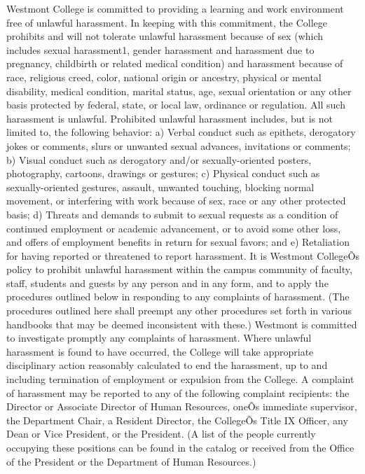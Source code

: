 \documentclass[letterpaper, 11pt]{article}
\begin{document}
	Westmont College is committed to providing a learning and work environment free of unlawful harassment.  In keeping with this commitment, the College prohibits and will not tolerate unlawful harassment because of sex (which includes sexual harassment1, gender harassment and harassment due to pregnancy, childbirth or related medical condition) and harassment because of race, religious creed, color, national origin or ancestry, physical or mental disability, medical condition, marital status, age, sexual orientation or any other basis protected by federal, state, or local law, ordinance or regulation.  All such harassment is unlawful.
	Prohibited unlawful harassment includes, but is not limited to, the following behavior:
	a) Verbal conduct such as epithets, derogatory jokes or comments, slurs or unwanted sexual advances, invitations or comments;
	b) Visual conduct such as derogatory and/or sexually-oriented posters, photography, cartoons, drawings or gestures;
	c) Physical conduct such as sexually-oriented gestures, assault, unwanted touching, blocking normal movement, or interfering with work because of sex, race or any other protected basis;
	d) Threats and demands to submit to sexual requests as a condition of continued employment or academic advancement, or to avoid some other loss, and offers of employment benefits in return for sexual favors; and
	e) Retaliation for having reported or threatened to report harassment.
	It is Westmont CollegeÕs policy to prohibit unlawful harassment within the campus community of faculty, staff, students and guests by any person and in any form, and to apply the procedures outlined below in responding to any complaints of harassment.  (The procedures outlined here shall preempt any other procedures set forth in various handbooks that may be deemed inconsistent with these.)  Westmont is committed to investigate promptly any complaints of harassment.  Where unlawful harassment is found to have occurred, the College will take appropriate disciplinary action reasonably calculated to end the harassment, up to and including termination of employment or expulsion from the College.
	A complaint of harassment may be reported to any of the following complaint recipients:  the Director or Associate Director of Human Resources, oneÕs immediate supervisor, the Department Chair, a Resident Director, the CollegeÕs Title IX Officer, any Dean or Vice President, or the President.  (A list of the people currently occupying these positions can be found in the catalog or received from the Office of the President or the Department of Human Resources.)
\end{document}
